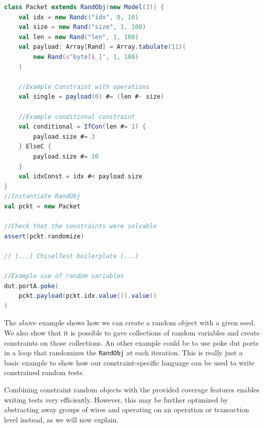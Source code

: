 \documentclass[conference]{IEEEtran}
\newcommand{\code}[1]{{\small{\texttt{#1}}}}
\begin{document}
\begin{lstlisting}[language=scala, caption={Random object toy example in Scala}, label={lst:randobjscala}]    
class Packet extends RandObj(new Model(3)) {
    val idx = new Randc("idx", 0, 10)
    val size = new Rand("size", 1, 100)
    val len = new Rand("len", 1, 100)
    val payload: Array[Rand] = Array.tabulate(11)(
        new Rand(s"byte[$_]", 1, 100)
    )

    //Example Constraint with operations
    val single = payload(0) #= (len #- size)
	
    //Example conditional constraint
    val conditional = IfCon(len #= 1) {
        payload.size #= 3
    } ElseC {
        payload.size #= 10
    }
    val idxConst = idx #< payload.size
}
//Instantiate RandObj
val pckt = new Packet

//Check that the constraints were solvable
assert(pckt.randomize)

// [...] ChiselTest boilerplate [...]

//Example use of random variables
dut.portA.poke(
    pckt.payload(pckt.idx.value()).value()
)

\end{lstlisting}

The above example shows how we can create a random object with a given seed. We also show that it is possible to gave collections of random variables and create constraints on those collections. An other example could be to use poke dut ports in a loop that randomizes the \texttt{RandObj} at each iteration. This is really just a basic example to show how our constraint-specific language can be used to write constrained random tests.


Combining constraint random objects with the provided coverage features enables writing tests very efficiently. However, this may be further optimized by abstracting away groups of wires and operating on an operation or transaction level instead, as we will now explain.
\end{document}
